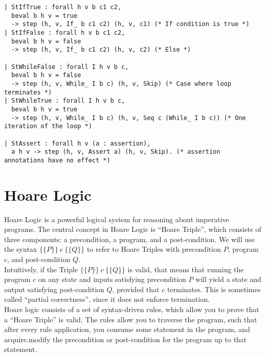 \documentclass{article}
\begin{document}
\begin{enumerate}
\begin{verbatim}
| StIfTrue : forall h v b c1 c2,
  beval b h v = true
  -> step (h, v, If_ b c1 c2) (h, v, c1) (* If condition is true *)
| StIfFalse : forall h v b c1 c2,
  beval b h v = false
  -> step (h, v, If_ b c1 c2) (h, v, c2) (* Else *)

| StWhileFalse : forall I h v b c,
  beval b h v = false
  -> step (h, v, While_ I b c) (h, v, Skip) (* Case where loop terminates *)
| StWhileTrue : forall I h v b c,
  beval b h v = true
  -> step (h, v, While_ I b c) (h, v, Seq c (While_ I b c)) (* One iteration of the loop *)

| StAssert : forall h v (a : assertion),
  a h v -> step (h, v, Assert a) (h, v, Skip). (* assertion annotations have no effect *)
    \end{verbatim}
\end{enumerate}

\section{Hoare Logic}
Hoare Logic is a powerful logical system for reasoning about imperative programs. The central concept in Hoare Logic is ``Hoare Triple'', which consists of three components: a precondition, a program, and a post-condition. We will use the syntax $ \{\{ P \}\}\ c\ \{\{Q\}\}$ to refer to Hoare Triples with precondition $P$, program $c$, and post-condition $Q$. \\

Intuitively, if the Triple $ \{\{ P \}\}\ c\ \{\{Q\}\}$ is valid, that means that running the program $c$ on any state and inputs satisfying precondition $P$ will yield a state and output satisfying post-condition $Q$, provided that $c$ terminates. This is sometimes called ``partial correctness'', since it does not enforce termination. \\

Hoare logic consists of a set of syntax-driven rules, which allow you to prove that a ``Hoare Triple'' is valid. The rules allow you to traverse the program, such that after every rule application, you consume some statement in the program, and acquire.modify the precondition or post-condition for the program up to that statement.
\end{document}
